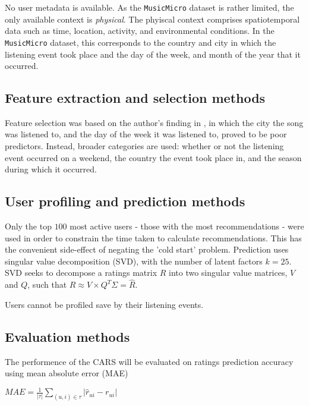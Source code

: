 \documentclass[conference]{IEEEtran}
\begin{document}
No user metadata is available. As the \verb|MusicMicro| dataset is rather limited, the only available context is \textit{physical}. The phyiscal context comprises spatiotemporal data such as time, location, activity, and environmental conditions. In the \verb|MusicMicro| dataset, this corresponds to the country and city in which the listening event took place and the day of the week, and month of the year that it occurred.

\subsection{Feature extraction and selection methods}

Feature selection was based on the author's finding in \cite{schedl_2013}, in which the city the song was listened to, and the day of the week it was listened to, proved to be poor predictors. Instead, broader categories are used: whether or not the listening event occurred on a weekend, the country the event took place in, and the season during which it occurred. 

\subsection{User profiling and prediction methods}

Only the top $100$ most active users - those with the most recommendations - were used in order to constrain the time taken to calculate recommendations. This has the convenient side-effect of negating the 'cold start' problem. Prediction uses singular value decomposition (SVD), with the number of latent factors $k = 25$. SVD seeks to decompose a ratings matrix $R$ into two singular value matrices, $V$ and $Q$, such that $R \approx V \times Q^T \Sigma = \hat{R}$.

Users cannot be profiled save by their listening events.

\subsection{Evaluation methods}

The performence of the CARS will be evaluated on ratings prediction accuracy using mean absolute error (MAE)

\begin{center}

$MAE = \frac{1}{|\tau|} \sum_{(u, i) \in \tau} |\hat{r}_{ui} - r_{ui}|$

\end{center} 
\end{document}
